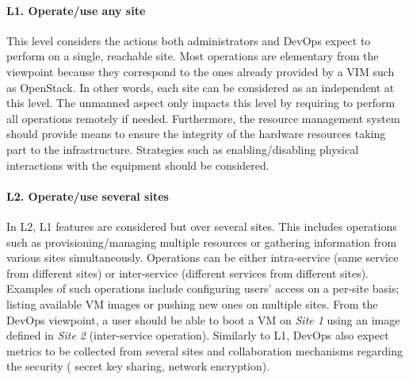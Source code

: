 \vspace*{-.3cm}
\paragraph{L1. Operate/use any site}
This level
considers the actions both administrators and DevOps expect to perform on a
single, reachable site.
%
Most operations are elementary from the \edge viewpoint because they correspond
to the ones already provided by a VIM such as OpenStack.
In other words, each \edge site can be considered as an independent \cloud at
this level. The unmanned aspect only impacts this level by requiring to perform
all operations remotely if needed.
Furthermore, the resource management system should provide means to
ensure the integrity of the hardware resources taking part to the \edge
infrastructure. Strategies such as enabling/disabling physical
interactions with the equipment should be considered.




\vspace*{-.3cm}
\paragraph{L2. Operate/use several sites}

In L2, L1 features are considered but over several sites. This
includes operations such as provisioning/managing multiple resources or
gathering information from various sites simultaneously.
Operations can be either intra-service (same service from different sites) or
inter-service (different services from different sites). Examples of 
such operations include configuring users'
access on a per-site basis; listing available VM images or pushing new
ones on multiple sites. From the
DevOps viewpoint, a user should be able to boot a VM on \emph{Site 1}
using an image defined in \emph{Site 2}
(inter-service operation). Similarly to L1, DevOps also expect metrics to be collected
from several sites and collaboration mechanisms regarding the security (\eg
secret key sharing, network encryption).

